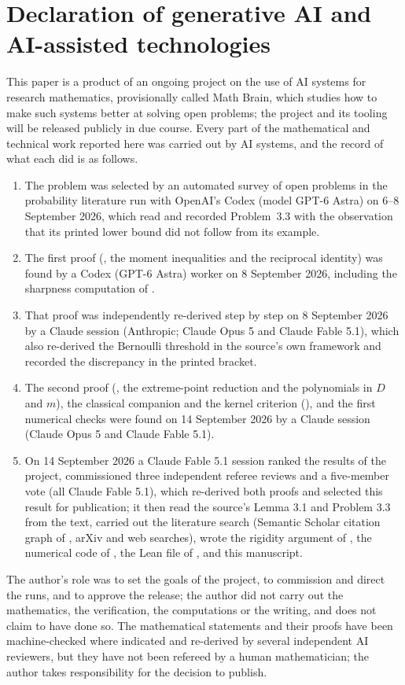 \documentclass[11pt]{amsart}
\theoremstyle{definition}
\begin{document}
\section*{Declaration of generative AI and AI-assisted technologies}
This paper is a product of an ongoing project on the use of AI systems for research mathematics, provisionally called Math Brain, which studies how to make such systems better at solving open problems; the project and its tooling will be released publicly in due course. Every part of the mathematical and technical work reported here was carried out by AI systems, and the record of what each did is as follows.
\begin{enumerate}
\item The problem was selected by an automated survey of open problems in the probability literature run with OpenAI's Codex (model GPT-6 Astra) on 6--8 September 2026, which read \cite{HasebeUeda} and recorded Problem~3.3 with the observation that its printed lower bound did not follow from its example.
\item The first proof (, the moment inequalities and the reciprocal identity) was found by a Codex (GPT-6 Astra) worker on 8 September 2026, including the sharpness computation of .
\item That proof was independently re-derived step by step on 8 September 2026 by a Claude session (Anthropic; Claude Opus 5 and Claude Fable 5.1), which also re-derived the Bernoulli threshold in the source's own framework and recorded the discrepancy in the printed bracket.
\item The second proof (, the extreme-point reduction and the polynomials in $D$ and $m$), the classical companion and the kernel criterion (), and the first numerical checks were found on 14 September 2026 by a Claude session (Claude Opus 5 and Claude Fable 5.1).
\item On 14 September 2026 a Claude Fable 5.1 session ranked the results of the project, commissioned three independent referee reviews and a five-member vote (all Claude Fable 5.1), which re-derived both proofs and selected this result for publication; it then read the source's Lemma 3.1 and Problem 3.3 from the text, carried out the literature search (Semantic Scholar citation graph of \cite{HasebeUeda}, arXiv and web searches), wrote the rigidity argument of , the numerical code of , the Lean file of , and this manuscript.
\end{enumerate}
The author's role was to set the goals of the project, to commission and direct the runs, and to approve the release; the author did not carry out the mathematics, the verification, the computations or the writing, and does not claim to have done so. The mathematical statements and their proofs have been machine-checked where indicated and re-derived by several independent AI reviewers, but they have not been refereed by a human mathematician; the author takes responsibility for the decision to publish.
\end{document}
